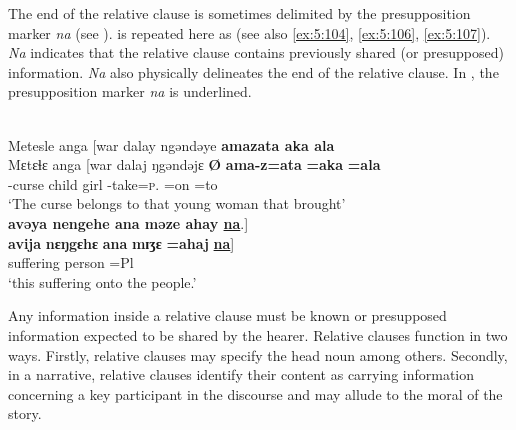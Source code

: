 The end of the relative clause is sometimes delimited by the presupposition marker \textit{na} (see ).  is repeated here as  (see also \ref{ex:5:104}, \ref{ex:5:106}, \ref{ex:5:107}). \textit{Na} indicates that the relative clause contains previously shared (or presupposed) information. \textit{Na} also physically delineates the end of the relative clause. In , the presupposition marker \textit{na} is underlined. 


\ea \label{ex:5:114}\\
Metesle  anga  [war  dalay  ngəndəye  \textbf{amazata  aka  ala}  \\
\gll  Mɛtɛɬɛ  anga    [war    dalaj  ŋgəndəjɛ \textbf{Ø} \textbf{ama-z=ata} \textbf{=aka}  \textbf{=ala}\\
      {\NOM}{}-curse   {\POSS}   child    girl       {\DEM}  { } {\DEP}{}-take=\textsc{p}.{\IO} =on   =to \\
\glt ‘The curse belongs to that young woman that brought’ \\     
      
\medskip
\textbf{avəya  nengehe  ana  məze  ahay   \underline{na}}.]\\
\gll   \textbf{avija}  \textbf{nɛŋgɛhɛ} \textbf{ana} \textbf{mɪʒɛ}    \textbf{=ahaj}  \textbf{\underline{na}}]\\
            suffering     {\DEM}      {\DAT}  person    =Pl   {\PSP}\\
\glt  ‘this suffering onto the people.’  
\z

Any information inside a relative clause must be known or presupposed information expected to be shared by the hearer. Relative clauses function in two ways. Firstly, relative clauses may specify the head noun among others. Secondly, in a narrative, relative clauses identify their content as carrying information concerning a key participant in the discourse and may allude to the moral of the story. 

